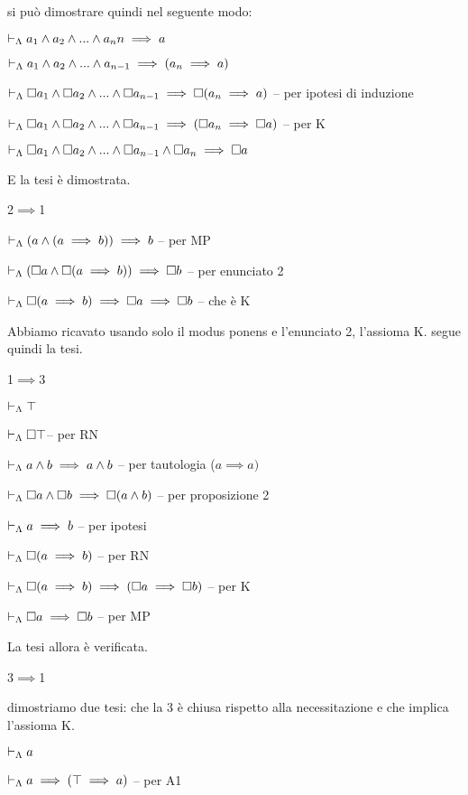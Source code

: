 si può dimostrare quindi nel seguente modo:

$\vdash_{\Lambda}a_{1}\wedge a_{2}\wedge...\wedge a_{n}n\implies a$

$\vdash_{\Lambda}a_{1}\wedge a_{2}\wedge...\wedge a_{n-1}\implies(a_{n}\implies a)$ 

$\vdash_{\Lambda}\square a_{1}\wedge\square a_{2}\wedge...\wedge\square a_{n-1}\implies\square(a_{n}\implies a)$
-- per ipotesi di induzione

$\vdash_{\Lambda}\square a_{1}\wedge\square a_{2}\wedge...\wedge\square a_{n-1}\implies(\square a_{n}\implies\square a)$
-- per K

$\vdash_{\Lambda}\square a_{1}\wedge\square a_{2}\wedge...\wedge\square a_{n-1}\wedge\square a_{n}\implies\square a$ 

E la tesi è dimostrata.

2$\implies$1

$\vdash_{\Lambda}(a\wedge(a\implies b))\implies b$ -- per MP

$\vdash_{\Lambda}(\square a\wedge\square(a\implies b))\implies\square b$
-- per enunciato 2

$\vdash_{\Lambda}\square(a\implies b)\implies\square a\implies\square b$
-- che è K

Abbiamo ricavato usando solo il modus ponens e l'enunciato 2, l'assioma
K. segue quindi la tesi.

1$\implies3$

$\vdash_{\Lambda}\top$

$\vdash_{\Lambda}\square\top$-- per RN

$\vdash_{\Lambda}a\wedge b\implies a\wedge b$ -- per tautologia
($a\implies a)$

$\vdash_{\Lambda}\square a\wedge\square b\implies\square(a\wedge b)$ --
per proposizione 2

$\vdash_{\Lambda}a\implies b$ -- per ipotesi

$\vdash_{\Lambda}\square(a\implies b)$ -- per RN

$\vdash_{\Lambda}\square(a\implies b)\implies(\square a\implies\square b)$
-- per K

$\vdash_{\Lambda}\square a\implies\square b$ -- per MP

La tesi allora è verificata.

3$\implies$1

dimostriamo due tesi: che la 3 è chiusa rispetto alla necessitazione
e che implica l'assioma K.

$\vdash_{\Lambda}a$

$\vdash_{\Lambda}a\implies(\top\implies a)$ -- per A1

